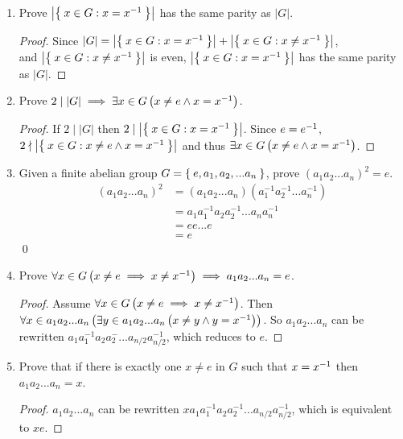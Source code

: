 \begin{enumerate}[label={\Alph*.},font={\bfseries}]
\begin{enumerate}[label={\arabic*},font={\bfseries}]
\begin{proof}
      So, $\left|\Set{x \in G : x \ne x\inverse}\right| = \left|\Set{x_0,x_0\inverse,x_1,x_1\inverse,x_2,x_2\inverse,x_3,x_3\inverse...}\right| = 2k$.
    \end{proof}
  \item Prove $\left|\Set{x \in G : x = x^{-1}}\right|$ has the same parity as $|G|$.
    \begin{proof}
      Since $|G| = \left|\Set{x \in G : x = x^{-1}}\right| + \left|\Set{x \in G : x \ne x^{-1}}\right|$, \\
      and $\left|\Set{x \in G : x \ne x^{-1}}\right|$ is even, $\left|\Set{x \in G : x = x^{-1}}\right|$ has the same parity as $|G|$.
    \end{proof}
  \item Prove $2 \mid |G| \implies \exists x \in G\left(x \ne e \land x = x^{-1} \right)$.
    \begin{proof}
      If $2 \mid |G|$ then $2 \mid \left|\Set{x \in G : x = x^{-1}}\right|$. Since $e = e^{-1}$, $2 \nmid \left|\Set{x \in G : x \ne e \land x = x^{-1}}\right|$ and thus $\exists x \in G\left(x \ne e \land x = x^{-1}\right)$.
    \end{proof}
  \item Given a finite abelian group $G = \Set{e,a_1,a_2,...a_n}$, prove $(a_1a_2...a_n)^2 = e$.
    \begin{align*}
      (a_1a_2...a_n)^2 &= (a_1a_2...a_n)(a_1^{-1}a_2^{-1}...a_n^{-1}) \\
      &= a_1a_1^{-1}a_2a_2^{-1}...a_na_n^{-1} \\
      &= ee...e \\
      &= e
    \end{align*}
    \qed
  \item Prove $\forall x \in G\left(x \ne e \implies x \ne x^{-1}\right) \implies a_1a_2...a_n = e$.
    \begin{proof}
      Assume $\forall x \in G\left(x \ne e \implies x \ne x^{-1}\right)$.
      Then $\forall x \in a_1a_2...a_n\left(\exists y \in a_1a_2...a_n\left(x \ne y \land y = x^{-1}\right)\right)$.
      So $a_1a_2...a_n$ can be rewritten $a_1a_1^{-1}a_2a_2^{-}...a_{n/2}a_{n/2}^{-1}$, which reduces to $e$.
    \end{proof}
  \item Prove that if there is exactly one $x \ne e$ in $G$ such that $x = x^{-1}$ then $a_1a_2...a_n = x$.
    \begin{proof}
      $a_1a_2...a_n$ can be rewritten $xa_1a_1^{-1}a_2a_2^{-1}...a_{n/2}a_{n/2}^{-1}$, which is equivalent to $xe$.

\end{proof}
\end{enumerate}
\end{enumerate}
